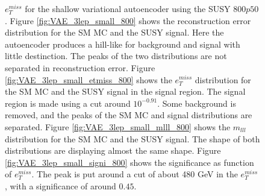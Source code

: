 \begin{figure}[H]
{    $e_T^{miss}$ for the shallow variational autoencoder using the SUSY $800p50$.
    Figure \ref{fig:VAE_3lep_small_800} shows the reconstruction error 
    distribution for the SM MC and the SUSY signal. Here the autoencoder produces a hill-like for background and 
    signal with little destinction. The peaks of the two distributions are not separated in reconstruction error. Figure \ref{fig:VAE_3lep_small_etmiss_800} 
    shows the $e_T^{miss}$ distribution for the SM MC and the SUSY signal in the signal region. 
    The signal region is made using a cut around $10^{-0.91}$. Some background is removed, and the peaks of the SM MC and signal 
    distributions are separated. Figure \ref{fig:VAE_3lep_small_mlll_800} shows the $m_{lll}$ distribution for the SM MC and the SUSY signal. 
    The shape of both distributions are displaying almost the same shape. Figure \ref{fig:VAE_3lep_small_signi_800} shows the significance as 
    function of $e_T^{miss}$. The peak is put around a cut of about 480 GeV in the $e_T^{miss}$, with a significance of around $0.45$.}
    \label{fig:VAE_3lep_small_rec_sig_signi_800}
\end{figure}



